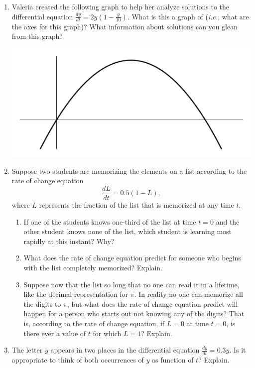 \begin{enumerate}
\item Valeria created the following graph to help her analyze solutions to the differential equation $\displaystyle \frac{dy}{dt} = 2y \left(1-\frac{y}{10} \right)$. What is this a graph of ({\em i.e.}, what are the axes for this graph)? What information about solutions can you glean from this graph? \label{01HWproblem3}
\begin{center}
\includegraphics[width=5in]{01/01ValeriaGraph.pdf}
\end{center}

\item  Suppose two students are memorizing the elements on a list according to the rate of change equation \[\frac{dL}{dt}=0.5(1-L),\] where $L$ represents the fraction of the list that is memorized at any time $t$.
\begin{enumerate}
\item	If one of the students knows one-third of the list at time $t = 0$ and the other student knows none of the list, which student is learning most rapidly at this instant? Why?
\item	What does the rate of change equation predict for someone who begins with the list completely memorized? Explain.
\item	Suppose now that the list so long that no one can read it in a lifetime, like the decimal representation for $\pi$. In reality no one can memorize all the digits to $\pi$, but what does the rate of change equation predict will happen for a person who starts out not knowing any of the digits? That is, according to the rate of change equation, if $L = 0$ at time $t = 0$, is there ever a value of $t$ for which $L = 1$? Explain. 

\end{enumerate}

\item The letter $y$ appears in two places in the differential equation $ \displaystyle \frac{dy}{dt} = 0.3y.$
Is it appropriate to think of both occurrences of $y$ as function of $t$? Explain.



\end{enumerate}
